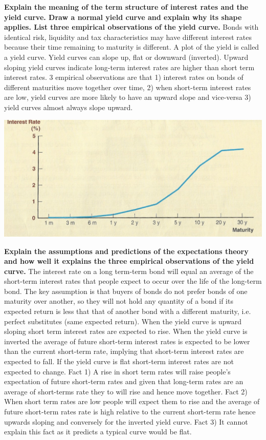 \documentclass[12pt]{examnotes}
\begin{document}
\textbf{Explain the meaning of the term structure of interest rates and the yield curve. Draw a normal yield curve and explain why its shape applies. List three empirical observations of the yield curve.}
Bonds with identical risk, liquidity and tax characteristics may have different interest rates because their time remaining to maturity is different. A plot of the yield is called a yield curve. Yield curves can slope up, flat or downward (inverted). Upward sloping yield curves indicate long-term interest rates are higher than short term interest rates. 3 empirical observations are that 1) interest rates on bonds of different maturities move together over time, 2) when short-term interest rates are low, yield curves are more likely to have an upward slope and vice-versa 3) yield curves almost always slope upward. 
\begin{center}
  \includegraphics[scale=0.4]{./imgs/yieldcurve.jpg}
\end{center}

\textbf{Explain the assumptions and predictions of the expectations theory and how well it explains the three empirical observations of the yield curve.}
The interest rate on a long term-term bond will equal an average of the short-term interest rates that people expect to occur over the life of the long-term bond. The key assumption is that buyers of bonds do not prefer bonds of one maturity over another, so they will not hold any quantity of a bond if its expected return is less that that of another bond with a different maturity, i.e. perfect substitutes (same expected return). When the yield curve is upward sloping short term interest rates are expected to rise. When the yield curve is inverted the average of future short-term interest rates is expected to be lower than the current short-term rate, implying that short-term interest rates are expected to fall. If the yield curve is flat short-term interest rates are not expected to change. Fact 1) A rise in short term rates will raise people's expectation of future short-term rates and given that long-term rates are an average of short-terms rate they to will rise and hence move together. Fact 2) When short term rates are low people will expect them to rise and the average of future short-term rates rate is high relative to the current short-term rate hence upwards sloping and conversely for the inverted yield curve. Fact 3) It cannot explain this fact as it predicts a typical curve would be flat. \\
\end{document}
